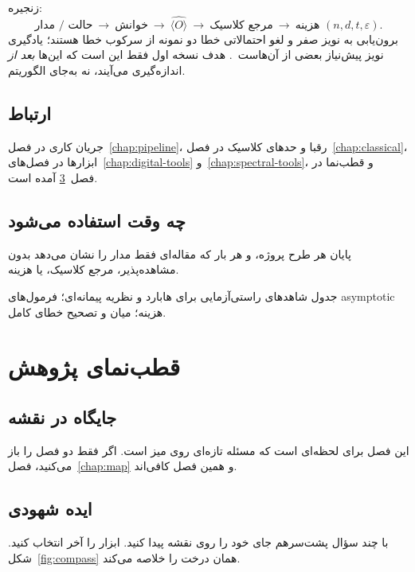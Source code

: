زنجیره:
\begin{equation}
	\text{حالت / مدار}
	\ \longrightarrow\
	\text{خوانش}
	\ \longrightarrow\
	\widehat{\langle O\rangle}
	\ \longrightarrow\
	\text{مرجع کلاسیک}
	\ \longrightarrow\
	\text{هزینه }(n,d,t,\varepsilon).
\end{equation}
برون‌یابی به نویز صفر و لغو احتمالاتی خطا دو نمونه از سرکوب خطا هستند؛ یادگیری نویز پیش‌نیاز بعضی از آن‌هاست~\cite{Endo2021}. هدف نسخه اول فقط این است که این‌ها \emph{بعد از} اندازه‌گیری می‌آیند، نه به‌جای الگوریتم.

\section{ارتباط}

جریان کاری در فصل~\ref{chap:pipeline}، رقبا و حدهای کلاسیک در فصل~\ref{chap:classical}، ابزارها در فصل‌های~\ref{chap:digital-tools} و~\ref{chap:spectral-tools}، و قطب‌نما در فصل~\ref{chap:compass} آمده است.

\section{چه وقت استفاده می‌شود}

پایان هر طرح پروژه، و هر بار که مقاله‌ای فقط مدار را نشان می‌دهد بدون مشاهده‌پذیر، مرجع کلاسیک، یا هزینه.

\begin{remark}[جای توسعه]
جدول شاهدهای راستی‌آزمایی برای هابارد و نظریه پیمانه‌ای؛ فرمول‌های asymptotic هزینه؛  میان  و تصحیح خطای کامل.
\end{remark}

\chapter{قطب‌نمای پژوهش}
\label{chap:compass}

\section{جایگاه در نقشه}

این فصل برای لحظه‌ای است که مسئله تازه‌ای روی میز است. اگر فقط دو فصل را باز می‌کنید، فصل~\ref{chap:map} و همین فصل کافی‌اند.

\section{ایده شهودی}

با چند سؤال پشت‌سرهم جای خود را روی نقشه پیدا کنید. ابزار را آخر انتخاب کنید. شکل~\ref{fig:compass} همان درخت را خلاصه می‌کند.

